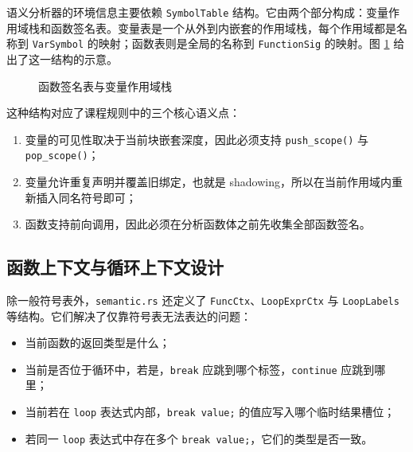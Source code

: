 \documentclass[UTF8,a4paper,12pt]{ctexart}
\newcommand{\pkg}[1]{\texttt{#1}}
\begin{document}
语义分析器的环境信息主要依赖 \pkg{SymbolTable} 结构。它由两个部分构成：变量作用域栈和函数签名表。变量表是一个从外到内嵌套的作用域栈，每个作用域都是名称到 \pkg{VarSymbol} 的映射；函数表则是全局的名称到 \pkg{FunctionSig} 的映射。图 \ref{fig:symbol-stack} 给出了这一结构的示意。

\begin{figure}[H]
    \centering
    \caption{函数签名表与变量作用域栈}
    \label{fig:symbol-stack}
\end{figure}

这种结构对应了课程规则中的三个核心语义点：

\begin{enumerate}[label=\arabic*.]
    \item 变量的可见性取决于当前块嵌套深度，因此必须支持 \pkg{push\_scope()} 与 \pkg{pop\_scope()}；
    \item 变量允许重复声明并覆盖旧绑定，也就是 shadowing，所以在当前作用域内重新插入同名符号即可；
    \item 函数支持前向调用，因此必须在分析函数体之前先收集全部函数签名。
\end{enumerate}

\subsection{函数上下文与循环上下文设计}

除一般符号表外，\pkg{semantic.rs} 还定义了 \pkg{FuncCtx}、\pkg{LoopExprCtx} 与 \pkg{LoopLabels} 等结构。它们解决了仅靠符号表无法表达的问题：

\begin{itemize}
    \item 当前函数的返回类型是什么；
    \item 当前是否位于循环中，若是，\pkg{break} 应跳到哪个标签，\pkg{continue} 应跳到哪里；
    \item 当前若在 \pkg{loop} 表达式内部，\pkg{break value;} 的值应写入哪个临时结果槽位；
    \item 若同一 \pkg{loop} 表达式中存在多个 \pkg{break value;}，它们的类型是否一致。
\end{itemize}
\end{document}

